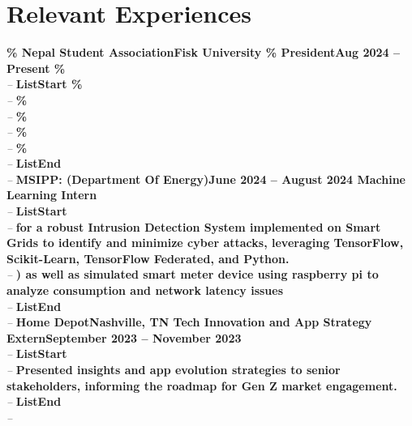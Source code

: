 \documentclass[letterpaper,11pt]{article}
\begin{document}
\section{Relevant Experiences}
\textbf{\%     Nepal Student AssociationFisk University
  \%     PresidentAug 2024 -- Present
  \%} \hfill  \\
\textit{} \hfill \textit{ -- }
\vspace{2pt}\textbf{ListStart
  \%} \hfill  \\
\textit{} \hfill \textit{ -- }
\vspace{2pt}\textbf{\%} \hfill  \\
\textit{} \hfill \textit{ -- }
\vspace{2pt}\textbf{\%} \hfill  \\
\textit{} \hfill \textit{ -- }
\vspace{2pt}\textbf{\%} \hfill  \\
\textit{} \hfill \textit{ -- }
\vspace{2pt}\textbf{\%} \hfill  \\
\textit{} \hfill \textit{ -- }
\vspace{2pt}\textbf{ListEnd} \hfill  \\
\textit{} \hfill \textit{ -- }
\vspace{2pt}\textbf{MSIPP: (Department Of Energy)June 2024 – August 2024
      Machine Learning Intern} \hfill  \\
\textit{} \hfill \textit{ -- }
\vspace{2pt}\textbf{ListStart} \hfill  \\
\textit{} \hfill \textit{ -- }
\vspace{2pt}\textbf{for a robust Intrusion Detection System implemented on Smart Grids to identify and minimize cyber attacks, leveraging TensorFlow, Scikit-Learn, TensorFlow Federated, and Python.} \hfill  \\
\textit{} \hfill \textit{ -- }
\vspace{2pt}\textbf{)  as well as simulated smart meter device using raspberry pi to analyze consumption and network latency issues} \hfill  \\
\textit{} \hfill \textit{ -- }
\vspace{2pt}\textbf{ListEnd} \hfill  \\
\textit{} \hfill \textit{ -- }
\vspace{2pt}\textbf{Home DepotNashville, TN
    Tech Innovation and App Strategy ExternSeptember 2023 -- November 2023} \hfill  \\
\textit{} \hfill \textit{ -- }
\vspace{2pt}\textbf{ListStart} \hfill  \\
\textit{} \hfill \textit{ -- }
\vspace{2pt}\textbf{Presented insights and app evolution strategies to senior stakeholders, informing the roadmap for Gen Z market engagement.} \hfill  \\
\textit{} \hfill \textit{ -- }
\vspace{2pt}\textbf{ListEnd} \hfill  \\
\textit{} \hfill \textit{ -- }
\vspace{2pt}
\end{document}

